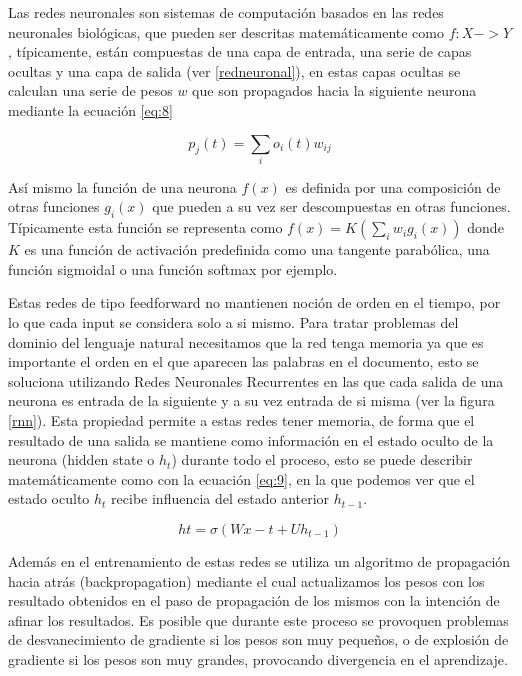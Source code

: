 Las redes neuronales son sistemas de computación basados en las redes neuronales biológicas, que pueden ser descritas matemáticamente como \(f: X -> Y\), típicamente, están compuestas de una capa de entrada, una serie de capas ocultas y una capa de salida (ver \ref{redneuronal}), en estas capas ocultas se calculan una serie de pesos \(w\) que son propagados hacia la siguiente neurona mediante la ecuación \ref{eq:8}

\begin{equation} \label{eq:8}
\mathit{p_j(t) = \sum_io_i(t)w_{ij}}
\end{equation}

Así mismo la función de una neurona \(f(x)\) es definida por una composición de otras funciones \(g_i(x)\) que pueden a su vez ser descompuestas en otras funciones. Típicamente esta función se representa como \(f(x) = K(\sum_iw_ig_i(x))\) donde \(K\) es una función de activación predefinida como una tangente parabólica, una función sigmoidal o una función softmax por ejemplo. 

Estas redes de tipo feedforward no mantienen noción de orden en el tiempo, por lo que cada input se considera solo a si mismo. Para tratar problemas del dominio del lenguaje natural necesitamos que la red tenga memoria ya que es importante el orden en el que aparecen las palabras en el documento, esto se soluciona utilizando Redes Neuronales Recurrentes en las que cada salida de una neurona es entrada de la siguiente y a su vez entrada de si misma (ver la figura \ref{rnn}). Esta propiedad permite a estas redes tener memoria, de forma que el resultado de una salida se mantiene como información en el estado oculto de la neurona (hidden state o \(h_t\)) durante todo el proceso, esto se puede describir matemáticamente como con la ecuación \ref{eq:9}, en la que podemos ver que el estado oculto \(h_t\) recibe influencia del estado anterior \(h_{t - 1}\).

\begin{equation} \label{eq:9}
ht = \sigma(Wx-t + Uh_{t-1})
\end{equation}

Además en el entrenamiento de estas redes se utiliza un algoritmo de propagación hacia atrás (backpropagation) mediante el cual actualizamos los pesos con los resultado obtenidos en el paso de propagación de los mismos con la intención de afinar los resultados. Es posible que durante este proceso se provoquen problemas de desvanecimiento de gradiente si los pesos son muy pequeños, o de explosión de gradiente si los pesos son muy grandes, provocando divergencia en el aprendizaje.

